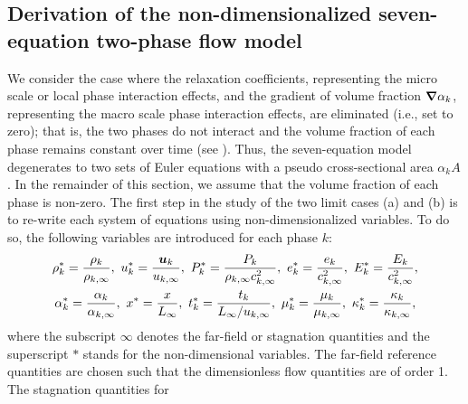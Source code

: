 \subsection{Derivation of the non-dimensionalized seven-equation two-phase flow model}\label{sec:scaled-SEM}
We consider the case where the relaxation coefficients, representing the micro scale or local phase interaction effects, 
and the gradient of volume fraction $\boldsymbol\nabla \alpha_k$, representing the macro scale phase interaction effects, are eliminated (i.e., set to zero); that is, 
the two phases do not interact and the volume fraction of each phase remains constant over time (see ). 
Thus, the seven-equation model degenerates to two sets of Euler equations with a pseudo cross-sectional area $\alpha_k A$. In 
the remainder of this section, we assume that the volume fraction of each phase is non-zero.
%
The first step in the study of the two limit cases (a) and (b) is to re-write each system of equations using non-dimensionalized 
variables. To do so, the following variables are introduced for each phase $k$:
%
\begin{multline}
\label{eq:norm_param}
\rho_k^*   = \frac{\rho_k}{\rho_{k,\infty}}           ,\
u_k^*      = \frac{\boldsymbol u_k}{u_{k,\infty}}                 ,\
P_k^*      = \frac{P_k}{\rho_{k,\infty} c^2_{k,\infty}}   ,\
e_k^*      = \frac{e_k}{c^2_{k,\infty} }              , \
E_k^*      = \frac{E_k}{c^2_{k,\infty} }              , \\
\alpha_k^*      = \frac{\alpha_k}{\alpha_{k,\infty} }              , \
x^* = \frac{x}{L_\infty}                      ,\
t_k^* = \frac{t_k}{L_\infty / u_{k,\infty}}           ,\
\mu_k^*    = \frac{\mu_k}{\mu_{k,\infty}}             ,\
\kappa_k^* = \frac{\kappa_k}{\kappa_{k,\infty}}       ,
\end{multline}
%
where  the subscript $\infty$ denotes the far-field or stagnation quantities and the superscript $*$ stands for the non-dimensional variables.
The far-field reference quantities are chosen such that the dimensionless flow quantities are of order 1. The stagnation quantities for 
